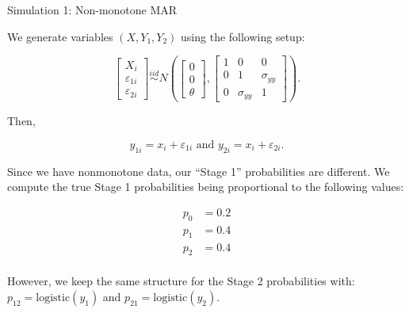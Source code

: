 \documentclass{beamer} %
\newcommand{\logistic}{{\text{logistic}}}
\begin{document}
\begin{frame}{Simulation 1: Non-monotone MAR}

    We generate variables $(X, Y_1, Y_2)$ using the following setup:

    \[\begin{bmatrix}
    X_i \\ \varepsilon_{1i} \\ \varepsilon_{2i}
    \end{bmatrix} \stackrel{iid}{\sim}
    N\left(
    \begin{bmatrix}
        0 \\ 0 \\ \theta
    \end{bmatrix},
    \begin{bmatrix}
        1 & 0 & 0 \\
        0 & 1 & \sigma_{yy}\\
        0 & \sigma_{yy} & 1
    \end{bmatrix}
    \right).\]

    Then, 

    \[y_{1i} = x_i + \varepsilon_{1i} \text{ and } 
    y_{2i} = x_i + \varepsilon_{2i}.\]

\end{frame}

\begin{frame}

    Since we have nonmonotone data, our ``Stage 1'' probabilities are
    different. We compute the true Stage 1 probabilities being proportional to
    the following values:
    
    \begin{align*}
        p_0 &= 0.2 \\
        p_1 &= 0.4 \\
        p_2 &= 0.4 \\
    \end{align*}
    
   However, we keep the same structure for the Stage 2 probabilities with:
   $p_{12} = \logistic(y_1)$ and $p_{21} = \logistic(y_2)$. 

\end{frame}

\begin{frame}

  

\end{frame}

\begin{frame}

  

\end{frame}
\end{document}
